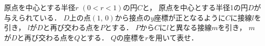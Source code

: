 \documentclass[../../main.tex]{subfiles}
\begin{document}
原点を中心とする半径$r$ $(0<r<1)$の円$C$と，
原点を中心とする半径1の円$D$が与えられている．
$D$上の点$(1, \, 0)$から接点の$y$座標が正となるように$C$に接線$l$を引き，
$l$が$D$と再び交わる点を$P$とする．
$P$から$C$に$l$と異なる接線$m$を引き，
$m$が$D$と再び交わる点を$Q$とする．
$Q$の座標を$r$を用いて表せ．
\end{document}

